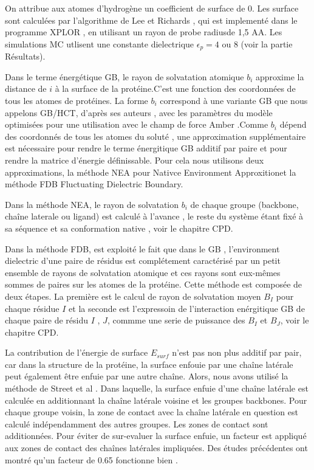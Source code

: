 On attribue aux atomes d'hydrogène un coefficient de surface de 0. Les surface sont calculées par l'algorithme de Lee et Richards \cite{Lee71},  qui est implementé dans le programme XPLOR \cite{Xplor}, en utilisant un rayon de \og probe radius\fg de 1,5 {AA}. Les simulations MC utlisent une constante dielectrique $\epsilon_p = 4$ ou $8$ (voir la partie Résultats).

Dans le terme énergétique GB, le rayon de solvatation atomique $b_i$ approxime la distance de $i$ à la surface de la protéine.C'est une fonction des coordonnées de tous les atomes de protéines. La forme $b_i$ correspond à une variante GB que nous appelons GB/HCT, d'après ses auteurs \cite{Hawkins95}, avec les paramètres du modèle optimisées pour une utilisation avec le champ de force Amber \cite{Lopes07}.Comme $b_i$ dépend des coordonnés de tous les atomes du soluté \cite{Hawkins95}, une approximation supplémentaire est nécessaire pour rendre le terme énergitique GB additif par paire et pour rendre la matrice d'énergie définissable.
Pour cela nous utilisons deux approximations, la méthode NEA pour \og Nativce Environment Approxition\fg et la méthode FDB \og Fluctuating Dielectric Boundary\fg \cite{Villa01}.

Dans la méthode NEA, le rayon de solvatation $b_i$ de chaque groupe (backbone, chaîne laterale ou ligand) est calculé à l'avance , le reste du système étant fixé à sa séquence et sa conformation native \cite{Simonson13b,Gaillard14}, voir le chapitre CPD.

Dans la méthode FDB, est exploité le fait que dans le GB , l'environment dielectric d'une paire de résidus est complétement caractérisé par un petit ensemble de rayons de solvatation atomique et ces rayons sont eux-mêmes sommes de paires sur les atomes de la protéine. Cette méthode est composée de deux étapes. La première est le calcul de rayon de solvatation moyen $B_I$ pour chaque résidue $I$ et la seconde est l'expressoin de l'interaction enérgitique GB de chaque paire de résidu $I$ , $J$, commme une serie de puissance des  $B_I$  et $B_J$, voir le chapitre CPD. 

La contribution de l'énergie de surface $E_{surf}$ n'est pas non plus additif par pair, car dans la structure de la protéine, la surface enfouie par une chaîne latérale peut également être enfuie par une autre chaîne. Alors, nous avons utilisé la méthode de Street et al \cite{Street98}. Dans laquelle, la surface enfuie d'une chaîne latérale est calculée en additionnant la chaîne latérale voisine et les groupes backbones. Pour chaque groupe voisin, la zone de contact avec la chaîne latérale en question est calculé indépendamment des autres groupes. Les zones de contact sont additionnées. Pour éviter de sur-evaluer la surface enfuie, un facteur est appliqué aux zones de contact des chaînes latérales impliquées. Des études précédentes ont montré qu'un facteur de 0.65 fonctionne bien \cite{Lopes07,Gaillard14}.  

